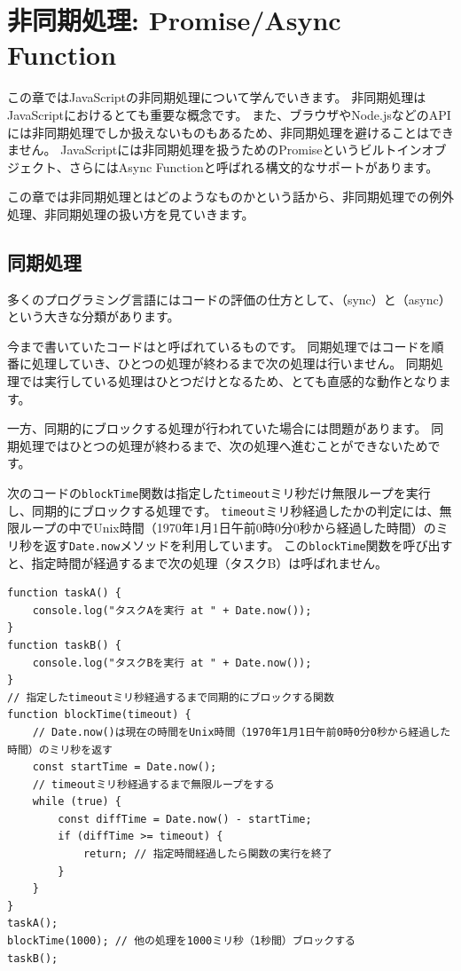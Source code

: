 \hypertarget{async-handling}{%
\chapter[非同期処理: Promise/Async Function]{非同期処理: Promise/Async
Function}\label{async-handling}}
\thispagestyle{frontheadings}

この章ではJavaScriptの非同期処理について学んでいきます。
非同期処理はJavaScriptにおけるとても重要な概念です。
また、ブラウザやNode.jsなどのAPIには非同期処理でしか扱えないものもあるため、非同期処理を避けることはできません。
JavaScriptには非同期処理を扱うためのPromiseというビルトインオブジェクト、さらにはAsync Functionと呼ばれる構文的なサポートがあります。

この章では非同期処理とはどのようなものかという話から、非同期処理での例外処理、非同期処理の扱い方を見ていきます。

\hypertarget{sync-processing}{%
\section{同期処理}\label{sync-processing}}

多くのプログラミング言語にはコードの評価の仕方として、\textbf{}（sync）と\textbf{}（async）という大きな分類があります。

今まで書いていたコードは\textbf{}と呼ばれているものです。
同期処理ではコードを順番に処理していき、ひとつの処理が終わるまで次の処理は行いません。
同期処理では実行している処理はひとつだけとなるため、とても直感的な動作となります。

一方、同期的にブロックする処理が行われていた場合には問題があります。
同期処理ではひとつの処理が終わるまで、次の処理へ進むことができないためです。

次のコードの\texttt{blockTime}関数は指定した\texttt{timeout}ミリ秒だけ無限ループを実行し、同期的にブロックする処理です。
\texttt{timeout}ミリ秒経過したかの判定には、無限ループの中でUnix時間（1970年1月1日午前0時0分0秒から経過した時間）のミリ秒を返す\texttt{Date.now}メソッドを利用しています。
この\texttt{blockTime}関数を呼び出すと、指定時間が経過するまで次の処理（タスクB）は呼ばれません。

\begin{lstlisting}
function taskA() {
    console.log("タスクAを実行 at " + Date.now());
}
function taskB() {
    console.log("タスクBを実行 at " + Date.now());
}
// 指定したtimeoutミリ秒経過するまで同期的にブロックする関数
function blockTime(timeout) { 
    // Date.now()は現在の時間をUnix時間（1970年1月1日午前0時0分0秒から経過した時間）のミリ秒を返す
    const startTime = Date.now();
    // timeoutミリ秒経過するまで無限ループをする
    while (true) {
        const diffTime = Date.now() - startTime;
        if (diffTime >= timeout) {
            return; // 指定時間経過したら関数の実行を終了
        }
    }
}
taskA();
blockTime(1000); // 他の処理を1000ミリ秒（1秒間）ブロックする
taskB();
\end{lstlisting}

